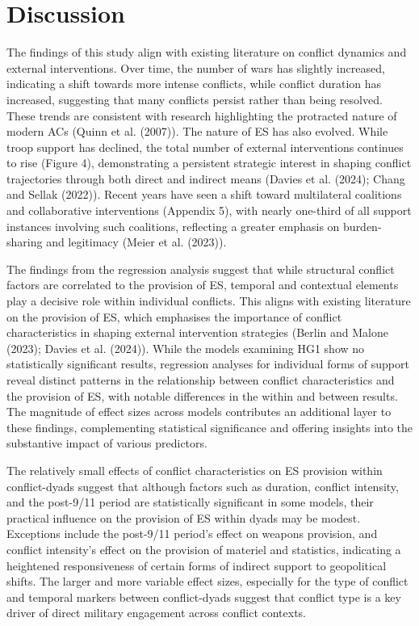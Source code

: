 \documentclass[
]{article}
\begin{document}
\section{Discussion}\label{discussion}

The findings of this study align with existing literature on conflict
dynamics and external interventions. Over time, the number of wars has
slightly increased, indicating a shift towards more intense conflicts,
while conflict duration has increased, suggesting that many conflicts
persist rather than being resolved. These trends are consistent with
research highlighting the protracted nature of modern ACs (Quinn et al.
(2007)). The nature of ES has also evolved. While troop support has
declined, the total number of external interventions continues to rise
(Figure 4), demonstrating a persistent strategic interest in shaping
conflict trajectories through both direct and indirect means (Davies et
al. (2024); Chang and Sellak (2022)). Recent years have seen a shift
toward multilateral coalitions and collaborative interventions (Appendix
5), with nearly one-third of all support instances involving such
coalitions, reflecting a greater emphasis on burden-sharing and
legitimacy (Meier et al. (2023)).

The findings from the regression analysis suggest that while structural
conflict factors are correlated to the provision of ES, temporal and
contextual elements play a decisive role within individual conflicts.
This aligns with existing literature on the provision of ES, which
emphasises the importance of conflict characteristics in shaping
external intervention strategies (Berlin and Malone (2023); Davies et
al. (2024)). While the models examining HG1 show no statistically
significant results, regression analyses for individual forms of support
reveal distinct patterns in the relationship between conflict
characteristics and the provision of ES, with notable differences in the
within and between results. The magnitude of effect sizes across models
contributes an additional layer to these findings, complementing
statistical significance and offering insights into the substantive
impact of various predictors.

The relatively small effects of conflict characteristics on ES provision
within conflict-dyads suggest that although factors such as duration,
conflict intensity, and the post-9/11 period are statistically
significant in some models, their practical influence on the provision
of ES within dyads may be modest. Exceptions include the post-9/11
period's effect on weapons provision, and conflict intensity's effect on
the provision of materiel and statistics, indicating a heightened
responsiveness of certain forms of indirect support to geopolitical
shifts. The larger and more variable effect sizes, especially for the
type of conflict and temporal markers between conflict-dyads suggest
that conflict type is a key driver of direct military engagement across
conflict contexts.
\end{document}
